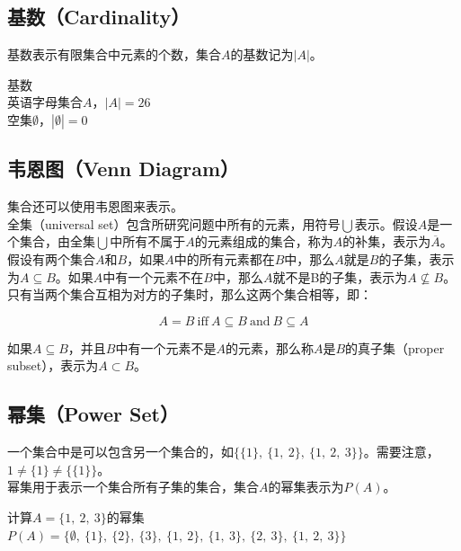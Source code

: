 \documentclass[12pt, openany, oneside]{book}
\begin{document}
\subsection{基数（Cardinality）}

基数表示有限集合中元素的个数，集合$ A $的基数记为$ |A| $。

\begin{tcolorbox}
	基数 \\
	英语字母集合$ A $，$ |A| = 26 $ \\
	空集$ \emptyset $，$ |\emptyset| = 0 $
\end{tcolorbox}

\subsection{韦恩图（Venn Diagram）}

集合还可以使用韦恩图来表示。 \\

全集（universal set）包含所研究问题中所有的元素，用符号$ \bigcup $表示。假设$ A $是一个集合，由全集$ \bigcup $中所有不属于$ A $的元素组成的集合，称为$ A $的补集，表示为$ \overline A $。 \\

假设有两个集合$ A $和$ B $，如果$ A $中的所有元素都在$ B $中，那么$ A $就是$ B $的子集，表示为$ A \subseteq B $。如果$ A $中有一个元素不在$ B $中，那么$ A $就不是B的子集，表示为$ A \nsubseteq B $。只有当两个集合互相为对方的子集时，那么这两个集合相等，即：

$$
	A = B\ \text{iff}\ A \subseteq B\ \text{and}\ B \subseteq A
$$

如果$ A \subseteq B $，并且$ B $中有一个元素不是$ A $的元素，那么称$ A $是$ B $的真子集（proper subset），表示为$ A \subset B $。

\subsection{幂集（Power Set）}

一个集合中是可以包含另一个集合的，如$ \{\{1\},\ \{1,\ 2\},\ \{1,\ 2,\ 3\}\} $。需要注意，$ 1 \neq \{1\} \neq \{\{1\}\} $。 \\

幂集用于表示一个集合所有子集的集合，集合$ A $的幂集表示为$ P(A) $。

\begin{tcolorbox}
	计算$ A = \{1,\ 2,\ 3\} $的幂集 \\
	$ P(A) = \{\emptyset,\ \{1\},\ \{2\},\ \{3\},\ \{1,\ 2\},\ \{1,\ 3\},\ \{2,\ 3\},\ \{1,\ 2,\ 3\}\} $
\end{tcolorbox}
\end{document}
